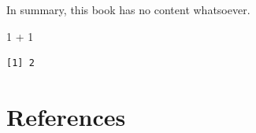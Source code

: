 \documentclass[
  a4paper,
]{book}
\newenvironment{Shaded}{\begin{snugshade}}{\end{snugshade}}
\newcommand{\DecValTok}[1]{\textcolor[rgb]{0.68,0.00,0.00}{#1}}
\newcommand{\SpecialCharTok}[1]{\textcolor[rgb]{0.37,0.37,0.37}{#1}}
\newlength{\cslhangindent}
\newenvironment{CSLReferences}[2] %
 {\begin{list}{}{%
  \setlength{\itemindent}{0pt}
  \setlength{\leftmargin}{0pt}
  \setlength{\parsep}{0pt}
  \ifodd #1
   \setlength{\leftmargin}{\cslhangindent}
   \setlength{\itemindent}{-1\cslhangindent}
  \fi
  \setlength{\itemsep}{#2\baselineskip}}}
 {\end{list}}
\begin{document}
In summary, this book has no content whatsoever.

\begin{Shaded}
\begin{Highlighting}[]
\DecValTok{1} \SpecialCharTok{+} \DecValTok{1}
\end{Highlighting}
\end{Shaded}

\begin{verbatim}
[1] 2
\end{verbatim}


\chapter*{References}\label{references}


\label{refs}
\begin{CSLReferences}{0}{1}
\end{CSLReferences}


\backmatter
\end{document}

